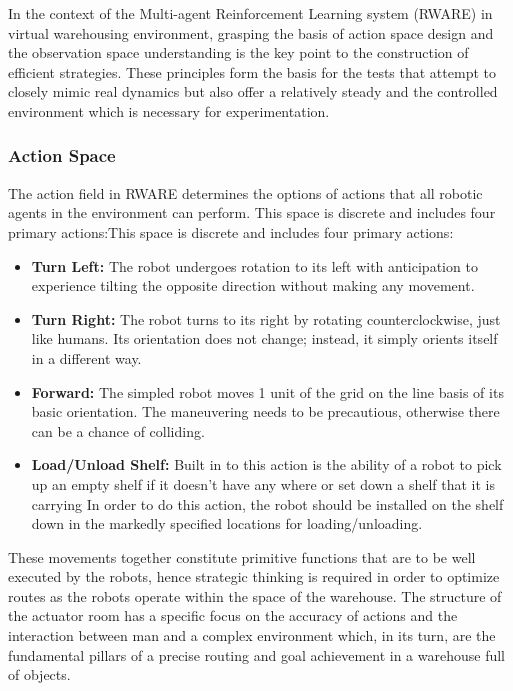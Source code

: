 \documentclass[11pt]{article}
\begin{document}
In the context of the Multi-agent Reinforcement Learning system (RWARE) in virtual warehousing environment, grasping the basis of action space design and the observation space understanding is the key point to the construction of efficient strategies. These principles form the basis for the tests that attempt to closely mimic real dynamics but also offer a relatively steady and the controlled environment which is necessary for experimentation.


\subsubsection{Action Space}

The action field in RWARE determines the options of actions that all robotic agents in the environment can perform. This space is discrete and includes four primary actions:This space is discrete and includes four primary actions:

\begin{itemize}
\item \textbf{Turn Left:} The robot undergoes rotation to its left with anticipation to experience tilting the opposite direction without making any movement.

\item \textbf{Turn Right:} The robot turns to its right by rotating counterclockwise, just like humans. Its orientation does not change; instead, it simply orients itself in a different way.

\item \textbf{Forward:} The simpled robot moves 1 unit of the grid on the line basis of its basic orientation. The maneuvering needs to be precautious, otherwise there can be a chance of colliding.

\item \textbf{Load/Unload Shelf:} Built in to this action is the ability of a robot to pick up an empty shelf if it doesn’t have any where or set down a shelf that it is carrying In order to do this action, the robot should be installed on the shelf down in the markedly specified locations for loading/unloading.
\end{itemize}

These movements together constitute primitive functions that are to be well executed by the robots, hence strategic thinking is required in order to optimize routes as the robots operate within the space of the warehouse. The structure of the actuator room has a specific focus on the accuracy of actions and the interaction between man and a complex environment which, in its turn, are the fundamental pillars of a precise routing and goal achievement in a warehouse full of objects.
\end{document}
